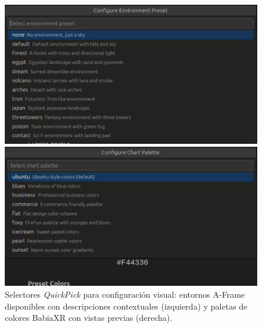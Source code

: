 \documentclass[a4paper, 12pt]{book}
\begin{document}
\begin{figure}[H]
\centering
\begin{minipage}[b]{0.48\textwidth}
\centering
\includegraphics[width=\textwidth]{img/ui-environment-preset-quickpick.png}
\end{minipage}
\hfill
\begin{minipage}[b]{0.48\textwidth}
\centering
\includegraphics[width=\textwidth]{img/ui-chart-palette-quickpick.png}
\end{minipage}
\caption{Selectores \emph{QuickPick} para configuración visual: entornos A-Frame disponibles con descripciones contextuales (izquierda) y paletas de colores BabiaXR con vistas previas (derecha).}
\label{fig:ui-quickpick-selectors}
\end{figure}
\end{document}
